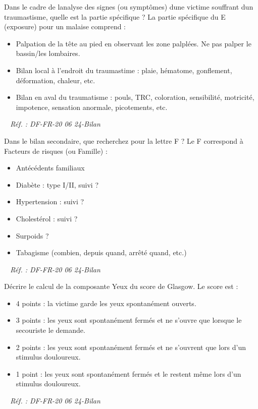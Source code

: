 \documentclass[grid,avery5371,landscape]{flashcards}
\makeatletter
\newcounter{nocarte}
\newcommand{\categ}[1]{%
  \def\@categ{#1}%
  \setcounter{nocarte}{0}%
}
\newcommand{\source}[1]{%
  \medskip
  \itshape%
   ~ \hfill Réf. : #1}
\makeatother
\begin{document}
\color[HTML]{003273}
\categ{PSE}
\begin{flashcard}[bilan]{
 Dans le cadre de lanalyse des signes (ou symptômes) dune victime souffrant dun traumastisme, quelle est la partie spécifique ?   }
  La partie spécifique du E (exposure) pour un malaise comprend : 
\begin{itemize} 
\item Palpation de la tête au pied en observant les zone palplées. Ne pas palper le bassin/les lombaires.
\item Bilan local à l'endroit du traumastime : plaie, hématome, gonflement, déformation, chaleur, etc.
\item Bilan en aval du traumatisme : pouls, TRC, coloration, sensibilité, motricité, impotence, sensation anormale, picotements, etc.
\end{itemize}

  \source{DF-FR-20 06 24-Bilan}
\end{flashcard}


\color[HTML]{003273}
\categ{PSE}
\begin{flashcard}[bilan]{
 Dans le bilan secondaire, que recherchez pour la lettre F ?   }
  Le F correspond à Facteurs de risques (ou Famille) : 
\begin{itemize} 
\item Antécédents familiaux
\item Diabète : type I/II, suivi ?
\item Hypertension : suivi ?
\item Cholestérol : suivi ?
\item Surpoids ?
\item Tabagisme (combien, depuis quand, arrêté quand, etc.)
\end{itemize}

  \source{DF-FR-20 06 24-Bilan}
\end{flashcard}


\color[HTML]{003273}
\categ{PSE}
\begin{flashcard}[bilan]{
 Décrire le calcul de la composante Yeux du score de Glasgow.   }
  Le score est :
\begin{itemize} 
\item 4 points : la victime garde les yeux spontanément ouverts.
\item 3 points : les yeux sont spontanément fermés et ne s'ouvre que lorsque le secouriste le demande.
\item 2 points : les yeux sont spontanément fermés et ne s'ouvrent que lors d'un stimulus douloureux.
\item 1 point : les yeux sont spontanément fermés et le restent même lors d'un stimulus douloureux.
\end{itemize}
  \source{DF-FR-20 06 24-Bilan}
\end{flashcard}
\end{document}
